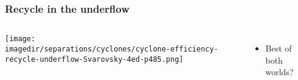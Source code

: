 \begin{frame}\frametitle{Recycle in the underflow}
	\begin{columns}[t]
			\begin{center}
				\texttt{[image: \\imagedir/separations/cyclones/cyclone-efficiency-recycle-underflow-Svarovsky-4ed-p485.png]}
			\end{center}
		\begin{itemize}
			\item	Best of both worlds?
		\end{itemize}
	\end{columns}
\end{frame}

% 
% 
% 
% 
